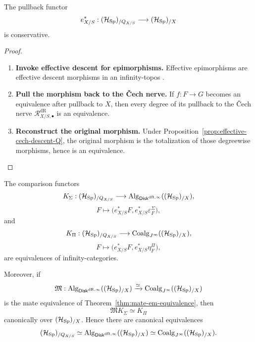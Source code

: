 \begin{proposition}
\label{prop:effective-pullback-conservative}
The pullback functor
\[
  e_{X/S}^*:(\mathcal H_{\operatorname{Sp}})_{/Q_{X/S}}\longrightarrow(\mathcal H_{\operatorname{Sp}})_{/X}
\]
is conservative.
\end{proposition}

\begin{proof}
\leavevmode
\begin{enumerate}[label=\textup{(\arabic*)}]
    \item \textbf{Invoke effective descent for epimorphisms.}
Effective epimorphisms are effective descent morphisms in an infinity-topos
\cite{LurieHTT}.

    \item \textbf{Pull the morphism back to the Čech nerve.}
If \(f:F\to G\) becomes an equivalence
after pullback to \(X\), then every degree of its pullback to the \v{C}ech
nerve \(\mathcal R^{\mathrm{dR}}_{X/S,\bullet}\) is an equivalence.

    \item \textbf{Reconstruct the original morphism.}
Under
Proposition~\ref{prop:effective-cech-descent-Q}, the original morphism is the
totalization of those degreewise morphisms, hence is an equivalence.
\end{enumerate}
\end{proof}

\begin{theorem}
\label{thm:effective-jet-descent}
The comparison functors
\[
  K_\Sigma:
  (\mathcal H_{\operatorname{Sp}})_{/Q_{X/S}}
  \longrightarrow
  \operatorname{Alg}_{\mathsf{Disk}^{\mathrm{dR},\infty}}
  ((\mathcal H_{\operatorname{Sp}})_{/X}),
\]
\[
  F\longmapsto
  \bigl(
    e_{X/S}^*F,
    e_{X/S}^*\varepsilon^\Sigma_F
  \bigr),
\]
and
\[
  K_\Pi:
  (\mathcal H_{\operatorname{Sp}})_{/Q_{X/S}}
  \longrightarrow
  \operatorname{Coalg}_{J^\infty}
  ((\mathcal H_{\operatorname{Sp}})_{/X}),
\]
\[
  F\longmapsto
  \bigl(
    e_{X/S}^*F,
    e_{X/S}^*\eta^\Pi_F
  \bigr),
\]
are equivalences of infinity-categories.

Moreover, if
\[
  \mathfrak M:
  \operatorname{Alg}_{\mathsf{Disk}^{\mathrm{dR},\infty}}
  ((\mathcal H_{\operatorname{Sp}})_{/X})
  \xrightarrow{\simeq}
  \operatorname{Coalg}_{J^\infty}
  ((\mathcal H_{\operatorname{Sp}})_{/X})
\]
is the mate equivalence of
Theorem~\ref{thm:mate-em-equivalence}, then
\[
  \mathfrak M K_\Sigma
  \simeq
  K_\Pi
\]
canonically over \((\mathcal H_{\operatorname{Sp}})_{/X}\). Hence there are canonical
equivalences
\[
  (\mathcal H_{\operatorname{Sp}})_{/Q_{X/S}}
  \simeq
  \operatorname{Alg}_{\mathsf{Disk}^{\mathrm{dR},\infty}}
  ((\mathcal H_{\operatorname{Sp}})_{/X})
  \simeq
  \operatorname{Coalg}_{J^\infty}
  ((\mathcal H_{\operatorname{Sp}})_{/X}).
\]
\end{theorem}

